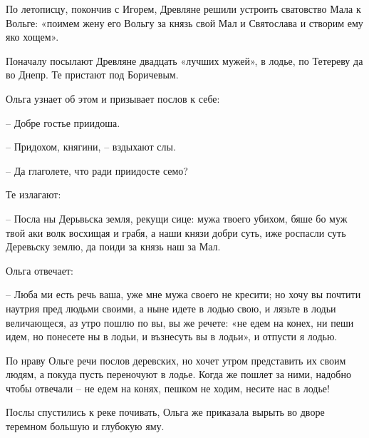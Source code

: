 По летописцу, покончив с Игорем, Древляне решили устроить сватовство Мала к Вольге: «поимем жену его Вольгу за князь свой Мал и Святослава и створим ему яко хощем». 


Поначалу посылают Древляне двадцать «лучших мужей», в лодье, по Тетереву да во Днепр. Те пристают под Боричевым.

Ольга узнает об этом и призывает послов к себе:

 – Добре гостье приидоша.

 – Придохом, княгини, – вздыхают слы. 

 – Да глаголете, что ради приидосте семо?

Те излагают:

 – Посла ны Дерьвьска земля, рекущи сице: мужа твоего убихом, бяше бо муж твой аки волк восхищая и грабя, а наши князи добри суть, иже роспасли суть Деревьску землю, да поиди за князь наш за Мал.

Ольга отвечает:

 – Люба ми есть речь ваша, уже мне мужа своего не кресити; но хочу вы почтити наутрия пред людьми своими, а ныне идете в лодью свою, и лязьте в лодьи величающеся, аз утро пошлю по вы, вы же речете: «не едем на конех, ни пеши идем, но понесете ны в лодьи, и възнесуть вы в лодьи», и отпусти я лодью.

По нраву Ольге речи послов деревских, но хочет утром представить их своим людям, а покуда пусть переночуют в лодье. Когда же пошлет за ними, надобно чтобы отвечали – не едем на конях, пешком не ходим, несите нас в лодье!

Послы спустились к реке почивать, Ольга же приказала вырыть во дворе теремном большую и глубокую яму.



